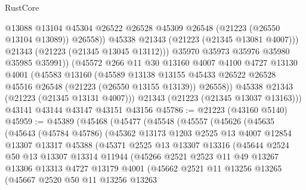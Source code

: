 \begin{lexlean}{RustCore}
\begin{coremodule}
                  @13088
                  @13104
                  @45304
                  @26522
                  @26528
                  @45309
                  @26548
                  (@21223 (@26550 @13104 @13089))
                  @26558))
              @45338
              @21343
              (@21223 (@21345 @13081 @4007)))
            @21343
            (@21223 (@21345 @13045 @13112)))
          @35970
          @35973
          @35976
          @35980
          @35985
          @35991))
      (@45572
        @266
        @11
        @30
        @13160
        @4007
        @4100
        @4727
        @13130
        @4001
        (@45583
          @13160
          (@45589
            @13138
            @13155
            @45433
            @26522
            @26528
            @45516
            @26548
            (@21223 (@26550 @13155 @13139))
            @26558))
        @45338
        @21343
        (@21223 (@21345 @13131 @4007)))
      @21343
      (@21223 (@21345 @13037 @13163)))
    @43141
    @43144
    @43147
    @43151
    @43156
@45786 := @21223 (@43160 @5140)
@45959 := @45389
    (@45468
      (@45477
        (@45548
          (@45557
            (@45626
              (@45635
                (@45643
                  (@45784 @45786)
                  (@45362
                    @13173
                    @1203
                    @2525
                    @13
                    @4007
                    @12854
                    @13307
                    @13317
                    @45388
                    (@45371
                      @2525
                      @13
                      @13307
                      @13316
                      (@45644
                        @2524
                        @50
                        @13
                        @13307
                        @13314
                        @11944
                        (@45266
                          @2521
                          @2523
                          @11
                          @49
                          @13267
                          @13306
                          @13313
                          @4727
                          @13179
                          @4001
                          (@45662
                            @2521
                            @11
                            @13256
                            @13265
                            (@45667
                              @2520
                              @50
                              @11
                              @13256
                              @13263

\end{coremodule}
\end{lexlean}
